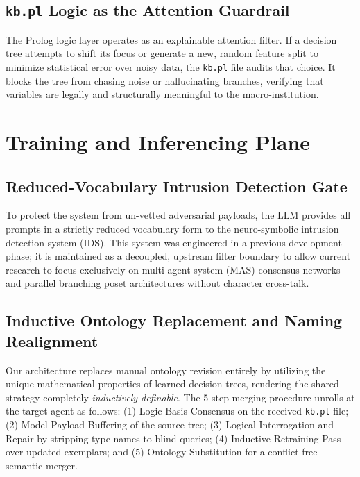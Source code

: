 \documentclass[11pt,fleqn]{article}
\begin{document}
\subsection{\texttt{kb.pl} Logic as the Attention Guardrail}
The Prolog logic layer operates as an explainable attention filter. If a decision tree attempts to shift its focus or generate a new, random feature split to minimize statistical error over noisy data, the \texttt{kb.pl} file audits that choice. It blocks the tree from chasing noise or hallucinating branches, verifying that variables are legally and structurally meaningful to the macro-institution.

\section{Training and Inferencing Plane}

\subsection{Reduced-Vocabulary Intrusion Detection Gate}
To protect the system from un-vetted adversarial payloads, the LLM provides all prompts in a strictly reduced vocabulary form to the neuro-symbolic intrusion detection system (IDS). This system was engineered in a previous development phase; it is maintained as a decoupled, upstream filter boundary to allow current research to focus exclusively on multi-agent system (MAS) consensus networks and parallel branching poset architectures without character cross-talk.

\subsection{Inductive Ontology Replacement and Naming Realignment}
Our architecture replaces manual ontology revision entirely by utilizing the unique mathematical properties of learned decision trees, rendering the shared strategy completely \textit{inductively definable}. The 5-step merging procedure unrolls at the target agent as follows: (1) Logic Basis Consensus on the received \texttt{kb.pl} file; (2) Model Payload Buffering of the source tree; (3) Logical Interrogation and Repair by stripping type names to blind queries; (4) Inductive Retraining Pass over updated exemplars; and (5) Ontology Substitution for a conflict-free semantic merger.
\end{document}
